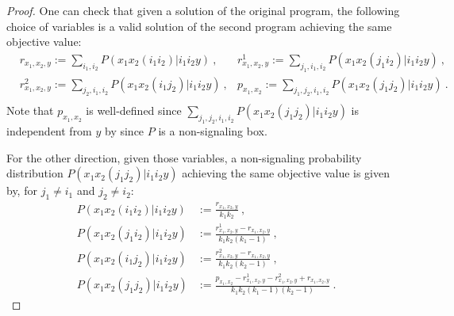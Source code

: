 \begin{proof}
  One can check that given a solution of the original program, the following choice of variables is a valid solution of the second program achieving the same objective value:
\begin{equation}
  \begin{aligned}
    &r_{x_1,x_2,y} := \sum_{i_1,i_2} P(x_1x_2(i_1i_2)|i_1i_2y) \ , &r^1_{x_1,x_2,y} := \sum_{j_1,i_1,i_2} P(x_1x_2(j_1i_2)|i_1i_2y) \ ,\\
    &r^2_{x_1,x_2,y} := \sum_{j_2,i_1,i_2} P(x_1x_2(i_1j_2)|i_1i_2y) \ , &p_{x_1,x_2} := \sum_{j_1,j_2,i_1,i_2} P(x_1x_2(j_1j_2)|i_1i_2y) \ . \\
  \end{aligned}
\end{equation}
Note that $p_{x_1,x_2}$ is well-defined since $\sum_{j_1,j_2,i_1,i_2} P(x_1x_2(j_1j_2)|i_1i_2y)$ is independent from $y$ by since $P$ is a non-signaling box.

For the other direction, given those variables, a non-signaling probability distribution $P(x_1x_2(j_1j_2)|i_1i_2y)$ achieving the same objective value is given by, for $j_1 \not=i_1$ and $j_2 \not= i_2$:
\begin{equation}
  \begin{aligned}
    P(x_1x_2(i_1i_2)|i_1i_2y) &:= \frac{r_{x_1,x_2,y}}{k_1k_2} \ ,\\
    P(x_1x_2(j_1i_2)|i_1i_2y) &:= \frac{r^1_{x_1,x_2,y} - r_{x_1,x_2,y}}{k_1k_2(k_1-1)} \ ,\\
    P(x_1x_2(i_1j_2)|i_1i_2y) &:= \frac{r^2_{x_1,x_2,y} - r_{x_1,x_2,y}}{k_1k_2(k_2-1)} \ ,\\
    P(x_1x_2(j_1j_2)|i_1i_2y) &:= \frac{p_{x_1,x_2} -  r^1_{x_1,x_2,y} - r^2_{x_1,x_2,y} + r_{x_1,x_2,y}}{k_1k_2(k_1-1)(k_2-1)} \ .
  \end{aligned}
\end{equation}
\end{proof}

